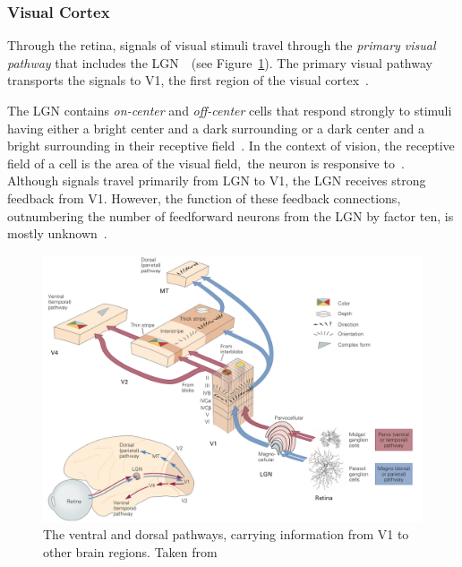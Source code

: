 \subsubsection{Visual Cortex}\label{subsubsec:visual-cortex}


Through the retina, signals of visual stimuli travel through the \textit{primary visual pathway} that includes the \ac{LGN}~\citep[p. 559]{mack2013principles}~(see Figure~\ref{fig:ventral_dorsal_pathway}).
The primary visual pathway transports the signals to \acf{V1}, the first region of the visual cortex~\citep[p. 559]{mack2013principles}.

The \ac{LGN} contains \textit{on-center} and \textit{off-center} cells that respond strongly to stimuli having either a bright center and a dark surrounding or a dark center and a bright surrounding in their receptive field~\citep[pp. 564-566]{mack2013principles}.
In the context of vision, the receptive field of a cell is the area of the visual field,\ the neuron is responsive to~\citep[p. 564]{mack2013principles}.
Although signals travel primarily from \ac{LGN} to \ac{V1}, the \ac{LGN} receives strong feedback from \ac{V1}.
However, the function of these feedback connections, outnumbering the number of feedforward neurons from the \ac{LGN} by factor ten, is mostly unknown~\citep[p. 573]{mack2013principles}.

\begin{figure}
    \centering
    \includegraphics[width=.8\textwidth]{images/ventral_dorsal.jpeg}
    \caption[Ventral and dorsal pathways]{The ventral and dorsal pathways, carrying information from \ac{V1} to other brain regions. Taken from \citet[p. 571]{mack2013principles}}
    \label{fig:ventral_dorsal_pathway}
\end{figure}

